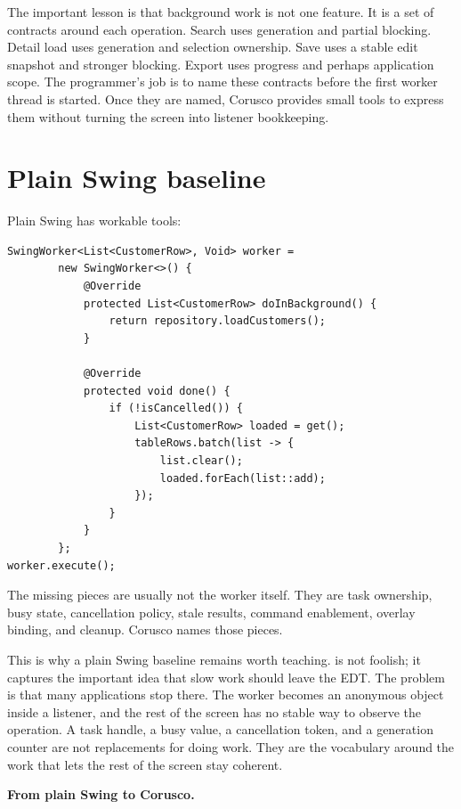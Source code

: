 The important lesson is that background work is not one feature. It is a set of
contracts around each operation. Search uses generation and partial blocking.
Detail load uses generation and selection ownership. Save uses a stable edit
snapshot and stronger blocking. Export uses progress and perhaps application
scope. The programmer's job is to name these contracts before the first worker
thread is started. Once they are named, Corusco provides small tools to express
them without turning the screen into listener bookkeeping.

\section{Plain Swing baseline}

Plain Swing has workable tools:

\begin{lstlisting}[caption={SwingWorker baseline.}]
SwingWorker<List<CustomerRow>, Void> worker =
        new SwingWorker<>() {
            @Override
            protected List<CustomerRow> doInBackground() {
                return repository.loadCustomers();
            }

            @Override
            protected void done() {
                if (!isCancelled()) {
                    List<CustomerRow> loaded = get();
                    tableRows.batch(list -> {
                        list.clear();
                        loaded.forEach(list::add);
                    });
                }
            }
        };
worker.execute();
\end{lstlisting}

The missing pieces are usually not the worker itself. They are task ownership,
busy state, cancellation policy, stale results, command enablement, overlay
binding, and cleanup. Corusco names those pieces.

This is why a plain Swing baseline remains worth teaching. 
is not foolish; it captures the important idea that slow work should leave the
EDT. The problem is that many applications stop there. The worker becomes an
anonymous object inside a listener, and the rest of the screen has no stable
way to observe the operation. A task handle, a busy value, a cancellation token,
and a generation counter are not replacements for doing work. They are the
vocabulary around the work that lets the rest of the screen stay coherent.

\textbf{From plain Swing to Corusco.}

